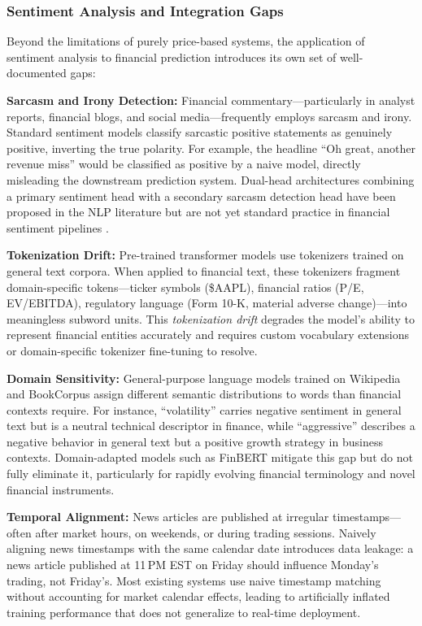 \subsubsection{Sentiment Analysis and Integration Gaps}
\label{sec:sentiment_gaps}

Beyond the limitations of purely price-based systems, the application of sentiment analysis to financial prediction introduces its own set of well-documented gaps:

\textbf{Sarcasm and Irony Detection:}
Financial commentary---particularly in analyst reports, financial blogs, and social media---frequently employs sarcasm and irony. Standard sentiment models classify sarcastic positive statements as genuinely positive, inverting the true polarity. For example, the headline ``Oh great, another revenue miss'' would be classified as positive by a naive model, directly misleading the downstream prediction system. Dual-head architectures combining a primary sentiment head with a secondary sarcasm detection head have been proposed in the NLP literature but are not yet standard practice in financial sentiment pipelines \cite{araci2019}.

\textbf{Tokenization Drift:}
Pre-trained transformer models use tokenizers trained on general text corpora. When applied to financial text, these tokenizers fragment domain-specific tokens---ticker symbols (\$AAPL), financial ratios (P/E, EV/EBITDA), regulatory language (Form 10-K, material adverse change)---into meaningless subword units. This \emph{tokenization drift} degrades the model's ability to represent financial entities accurately and requires custom vocabulary extensions or domain-specific tokenizer fine-tuning to resolve.

\textbf{Domain Sensitivity:}
General-purpose language models trained on Wikipedia and BookCorpus assign different semantic distributions to words than financial contexts require. For instance, ``volatility'' carries negative sentiment in general text but is a neutral technical descriptor in finance, while ``aggressive'' describes a negative behavior in general text but a positive growth strategy in business contexts. Domain-adapted models such as FinBERT \cite{araci2019} mitigate this gap but do not fully eliminate it, particularly for rapidly evolving financial terminology and novel financial instruments.

\textbf{Temporal Alignment:}
News articles are published at irregular timestamps---often after market hours, on weekends, or during trading sessions. Naively aligning news timestamps with the same calendar date introduces data leakage: a news article published at 11\,PM EST on Friday should influence Monday's trading, not Friday's. Most existing systems use naive timestamp matching without accounting for market calendar effects, leading to artificially inflated training performance that does not generalize to real-time deployment.

